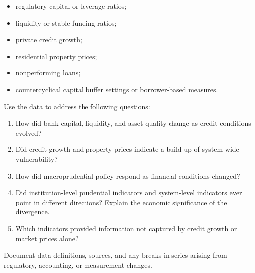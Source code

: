 \begin{itemize}

\item regulatory capital or leverage ratios;

\item liquidity or stable-funding ratios;

\item private credit growth;

\item residential property prices;

\item nonperforming loans;

\item countercyclical capital buffer settings or borrower-based measures.

\end{itemize}

Use the data to address the following questions:

\begin{enumerate}

\item How did bank capital, liquidity, and asset quality change as credit conditions evolved?

\item Did credit growth and property prices indicate a build-up of system-wide vulnerability?

\item How did macroprudential policy respond as financial conditions changed?

\item Did institution-level prudential indicators and system-level indicators ever point in different directions? Explain the economic significance of the divergence.

\item Which indicators provided information not captured by credit growth or market prices alone?

\end{enumerate}

Document data definitions, sources, and any breaks in series arising from regulatory, accounting, or measurement changes.





